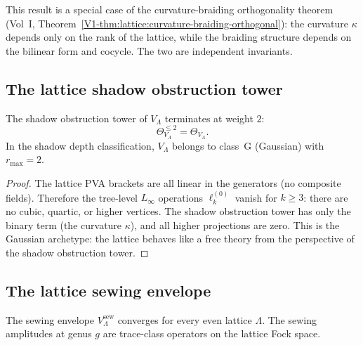 \begin{remark}
This result is a special case of the curvature-braiding orthogonality
theorem
(Vol~I, Theorem~\ref*{V1-thm:lattice:curvature-braiding-orthogonal}):
the curvature $\kappa$ depends only on the rank of the lattice, while
the braiding structure depends on the bilinear form and cocycle. The
two are independent invariants.
\end{remark}

\subsection{The lattice shadow obstruction tower}

\begin{proposition}
The shadow obstruction tower of $V_\Lambda$ terminates at weight $2$:
\[
\Theta_{V_\Lambda}^{\le 2} = \Theta_{V_\Lambda}.
\]
In the shadow depth classification, $V_\Lambda$ belongs to class~G
(Gaussian) with $r_{\max} = 2$.
\end{proposition}

\begin{proof}
The lattice PVA brackets are all linear in the generators (no
composite fields). Therefore the tree-level $L_\infty$ operations
$\ell_k^{(0)}$ vanish for $k \ge 3$: there are no cubic, quartic, or
higher vertices. The shadow obstruction tower has only the binary term
(the curvature $\kappa$), and all higher projections are zero.
This is the Gaussian archetype: the lattice behaves like a free theory
from the perspective of the shadow obstruction tower.
\end{proof}

\subsection{The lattice sewing envelope}

\begin{theorem}
The sewing envelope $V_\Lambda^{\mathrm{sew}}$ converges for every even
lattice $\Lambda$. The sewing amplitudes at genus $g$ are trace-class
operators on the lattice Fock space.
\end{theorem}

